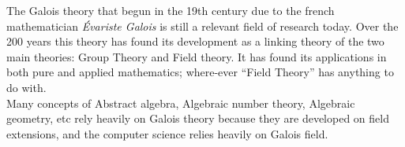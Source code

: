 The Galois theory that begun in the 19th century due to the french mathematician \textit{Évariste Galois} is still a relevant field of research today. Over the 200 years this theory has found its development as a linking theory of the two main theories: Group Theory and Field theory. It has found its applications in both pure and applied mathematics; where-ever ``Field Theory'' has anything to do with.\\[3mm]
Many concepts of Abstract algebra, Algebraic number theory, Algebraic geometry, etc rely heavily on Galois theory because they are developed on field extensions, and the computer science relies heavily on Galois field.